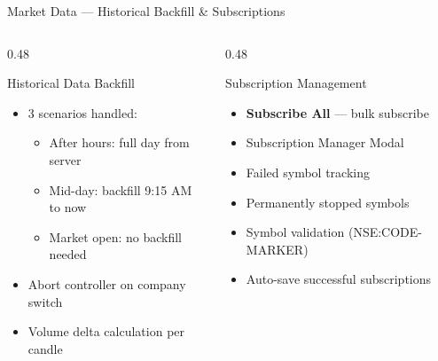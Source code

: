 \documentclass[aspectratio=169, 11pt]{beamer}
\begin{document}
\begin{frame}{Market Data — Historical Backfill \& Subscriptions}
\begin{columns}[T]
\begin{column}{0.48\textwidth}
\begin{block}{Historical Data Backfill}
\begin{itemize}
  \item 3 scenarios handled:
  \begin{itemize}
    \item After hours: full day from server
    \item Mid-day: backfill 9:15 AM to now
    \item Market open: no backfill needed
  \end{itemize}
  \item Abort controller on company switch
  \item Volume delta calculation per candle
\end{itemize}
\end{block}
\end{column}
\begin{column}{0.48\textwidth}
\begin{block}{Subscription Management}
\begin{itemize}
  \item \textbf{Subscribe All} — bulk subscribe
  \item Subscription Manager Modal
  \item Failed symbol tracking
  \item Permanently stopped symbols
  \item Symbol validation (NSE:CODE-MARKER)
  \item Auto-save successful subscriptions
\end{itemize}
\end{block}
\end{column}
\end{columns}
\end{frame}
\end{document}
